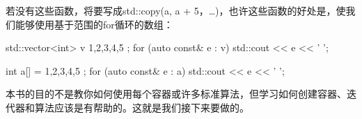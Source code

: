 若没有这些函数，将要写成std::copy(a, a + 5，…)，也许这些函数的好处是，使我们能够使用基于范围的for循环的数组：

\begin{cpp}
std::vector<int> v{ 1,2,3,4,5 };
for (auto const& e : v)
	std::cout << e << ' ';

int a[] = { 1,2,3,4,5 };
for (auto const& e : a)
	std::cout << e << ' ';
\end{cpp}

本书的目的不是教你如何使用每个容器或许多标准算法，但学习如何创建容器、迭代器和算法应该是有帮助的。这就是我们接下来要做的。





















